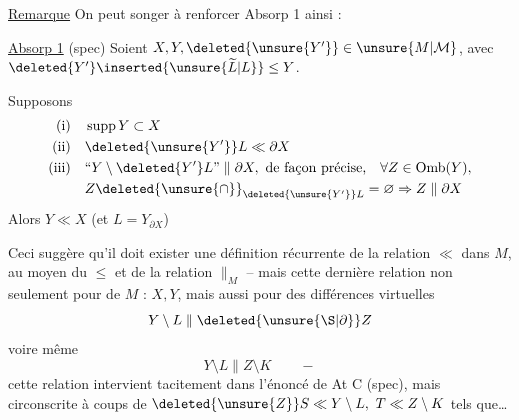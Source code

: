 
\uline{Remarque} On peut songer à renforcer Absorp 1 ainsi :

\uline{Absorp 1} (spec) Soient $X,Y,\deleted{\unsure{Y'}}\in\unsure{M|\mathcal M}$, avec $\deleted{Y'}\inserted{\unsure{\widetilde L|L}}\leq Y$.

Supposons
\[
\begin{aligned}
\text{(i)}\quad &\operatorname{supp}Y\subset X\\
\text{(ii)}\quad &\deleted{\unsure{Y'}}L\ll\partial X\\
\text{(iii)}\quad &\text{``}Y\setminus\deleted{Y'}L\text{''}\parallel\partial X,\ \text{de façon précise,}\quad\forall Z\in\operatorname{Omb}(Y),\\
&Z\deleted{\unsure{\cap}}_{\deleted{\unsure{Y'}}L}=\varnothing\Rightarrow Z\parallel\partial X
\end{aligned}
\]
Alors $Y\ll X$ (et $L=Y_{\partial X}$)

Ceci suggère qu'il doit exister une définition récurrente de la relation $\ll$ dans $M$, au moyen du $\leq$ et de la relation $\parallel_M$ -- mais cette dernière relation non seulement pour  de $M$ : $X,Y$, mais aussi pour des différences virtuelles
\[
Y\setminus L\parallel\deleted{\unsure{\S|\partial}}Z
\]
voire même
\[
Y\setminus L\parallel Z\setminus K\qquad -
\]
cette relation intervient tacitement dans l'énoncé de At C (spec), mais circonscrite à coups de $\deleted{\unsure{Z}}S\ll Y\setminus L,\ T\ll Z\setminus K$ tels que\ldots
